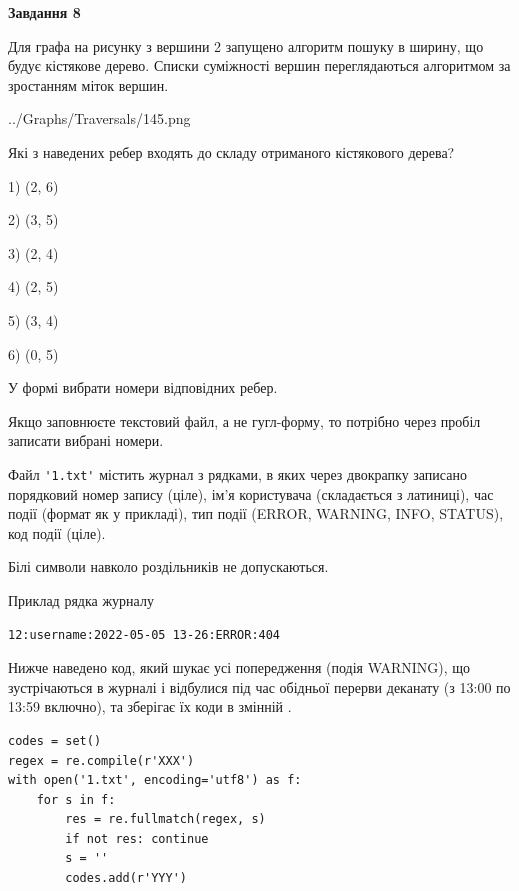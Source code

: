 \documentclass[12pt, ukrainian]{article}
\def\code#1{\Verb!#1!}
\begin{document}
{\begin {large}
{\begin {center}\textbf{Завдання 8}\end {center}}\par
Для графа на рисунку з вершини 2 запущено алгоритм пошуку в ширину, що будує кістякове дерево. Списки суміжності вершин переглядаються алгоритмом за зростанням міток вершин.\par
\begin{center}
	{../Graphs/Traversals/145.png}
\end{center}
\par Які з наведених ребер входять до складу отриманого кістякового дерева?\par
1) (2, 6)\par
2) (3, 5)\par
3) (2, 4)\par
4) (2, 5)\par
5) (3, 4)\par
6) (0, 5)\par
{\vskip 15pt} У формі вибрати номери відповідних ребер.


Якщо заповнюєте текстовий файл, а не гугл-форму, то потрібно через пробіл записа\-ти вибрані номери.\par
\newpage


Файл \code{'1.txt'} містить журнал з рядками, в яких через двокрапку записано поряд\-ко\-вий номер запису (ціле), ім'я користувача (складається з латиниці), час події (фор\-мат як у прикладі), тип події (ERROR, WARNING, INFO, STATUS), код події (ціле).

Білі символи навколо роздільників не допускаються.

Приклад рядка журналу



\begin{verbatim}
12:username:2022-05-05 13-26:ERROR:404
\end{verbatim}


Нижче наведено код, який шукає усі попередження (подія WARNING), що зустрі\-ча\-ються в журналі і відбулися під час обідньої перерви деканату (з 13:00 по 13:59 включно), та зберігає їх коди в змінній .



\begin{verbatim}
codes = set()
regex = re.compile(r'XXX')
with open('1.txt', encoding='utf8') as f:
    for s in f:
        res = re.fullmatch(regex, s)
        if not res: continue
        s = ''
        codes.add(r'YYY')
\end{verbatim}





\end{large}}
\end{document}
